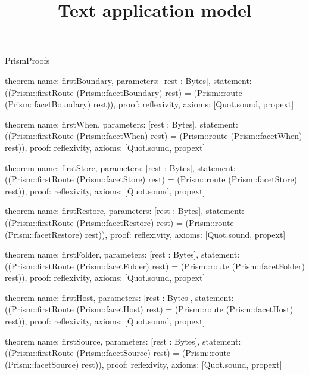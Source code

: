 \begin{lexlean}{PrismProofs}
\title{Text application model}
\begin{semanticmodule}
theorem{
  name: firstBoundary,
  parameters: [rest : Bytes],
  statement: ((Prism::firstRoute (Prism::facetBoundary) rest) = (Prism::route (Prism::facetBoundary) rest)),
  proof: reflexivity{},
  axioms: [Quot.sound, propext]
}

theorem{
  name: firstWhen,
  parameters: [rest : Bytes],
  statement: ((Prism::firstRoute (Prism::facetWhen) rest) = (Prism::route (Prism::facetWhen) rest)),
  proof: reflexivity{},
  axioms: [Quot.sound, propext]
}

theorem{
  name: firstStore,
  parameters: [rest : Bytes],
  statement: ((Prism::firstRoute (Prism::facetStore) rest) = (Prism::route (Prism::facetStore) rest)),
  proof: reflexivity{},
  axioms: [Quot.sound, propext]
}

theorem{
  name: firstRestore,
  parameters: [rest : Bytes],
  statement: ((Prism::firstRoute (Prism::facetRestore) rest) = (Prism::route (Prism::facetRestore) rest)),
  proof: reflexivity{},
  axioms: [Quot.sound, propext]
}

theorem{
  name: firstFolder,
  parameters: [rest : Bytes],
  statement: ((Prism::firstRoute (Prism::facetFolder) rest) = (Prism::route (Prism::facetFolder) rest)),
  proof: reflexivity{},
  axioms: [Quot.sound, propext]
}

theorem{
  name: firstHost,
  parameters: [rest : Bytes],
  statement: ((Prism::firstRoute (Prism::facetHost) rest) = (Prism::route (Prism::facetHost) rest)),
  proof: reflexivity{},
  axioms: [Quot.sound, propext]
}

theorem{
  name: firstSource,
  parameters: [rest : Bytes],
  statement: ((Prism::firstRoute (Prism::facetSource) rest) = (Prism::route (Prism::facetSource) rest)),
  proof: reflexivity{},
  axioms: [Quot.sound, propext]
}


\end{semanticmodule}
\end{lexlean}
